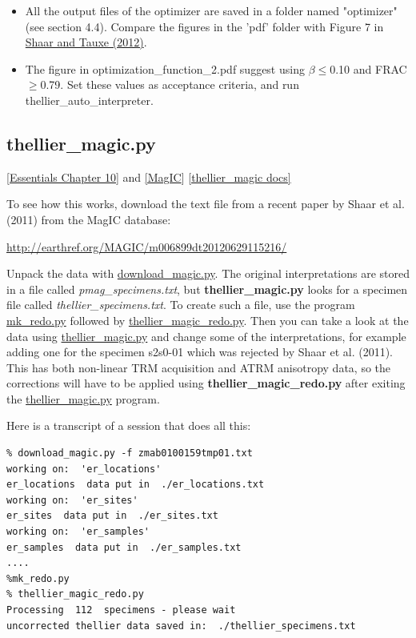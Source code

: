\documentclass[11pt]{book}
\begin{document}
{{\begin{itemize}
\begin{itemize}
\item All the output files of the optimizer are saved in a folder named "optimizer" (see section 4.4). Compare the figures in the 'pdf' folder with Figure 7 in \href{http://magician.ucsd.edu/~ltauxe/CV/open/shaar12.pdf}{Shaar and Tauxe (2012)}.  
\item The figure in optimization\_function\_2.pdf suggest using $\beta \leq$0.10 and FRAC  $ \geq $0.79. Set these values as acceptance criteria, and run thellier\_auto\_interpreter.  
\end{itemize}
\end{itemize}



\subsection{thellier\_magic.py} 
\href{http://magician.ucsd.edu/Essentials_2/WebBook2ch10.html#ch10}{ [Essentials Chapter 10]} and \href{#MagIC}{[MagIC}]
\href{http://earthref.org/PmagPy/pmagpydocs/thellier_magic-module.html}{[thellier\_magic docs]}

To see how this works, download the text file from a recent paper by Shaar et al. (2011) from the MagIC database:

\nocite{shaar11}
\url{http://earthref.org/MAGIC/m006899dt20120629115216/}

Unpack the data with \href{#download_magic.py}{download\_magic.py}.   The original interpretations are stored in a file called {\it pmag\_specimens.txt}, but {\bf thellier\_magic.py} looks for a specimen file called {\it thellier\_specimens.txt}.  To create such a file, use the program \href{#mk_redo.py}{mk\_redo.py} followed by \href{#thellier_magic_redo.py}{thellier\_magic\_redo.py}.  Then you can take a look  at the data using \href{#thellier_magic.py}{thellier\_magic.py} and change some of the interpretations, for example adding one for the specimen s2s0-01 which was rejected by Shaar et al. (2011).   This has both non-linear TRM acquisition and ATRM anisotropy data, so the corrections will have to be applied using {\bf thellier\_magic\_redo.py} after exiting the \href{thellier_magic.py}{thellier\_magic.py} program.   

Here is a transcript of a session that does all this:

\begin{verbatim}
% download_magic.py -f zmab0100159tmp01.txt 
working on:  'er_locations'
er_locations  data put in  ./er_locations.txt
working on:  'er_sites'
er_sites  data put in  ./er_sites.txt
working on:  'er_samples'
er_samples  data put in  ./er_samples.txt
....
%mk_redo.py
% thellier_magic_redo.py
Processing  112  specimens - please wait 
uncorrected thellier data saved in:  ./thellier_specimens.txt


\end{verbatim}}}
\end{document}
